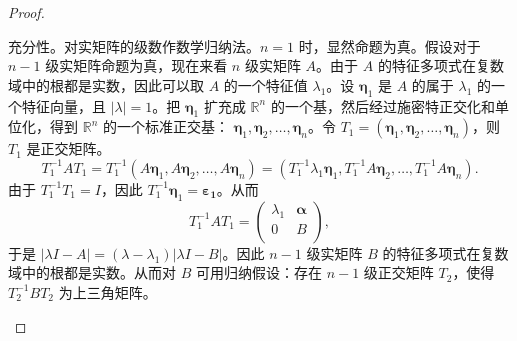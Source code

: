 \begin{enumerate}[1~]
\begin{proof}
\begin{subproof}
充分性。对实矩阵的级数作数学归纳法。$n = 1$ 时，显然命题为真。假设对于 $n - 1$ 级实矩阵命题为真，现在来看 $n$ 级实矩阵 $A$。由于 $A$ 的特征多项式在复数域中的根都是实数，因此可以取 $A$ 的一个特征值 $\lambda_1$。设 $\boldsymbol{\eta}_1$ 是 $A$ 的属于 $\lambda_1$ 的一个特征向量，且 $|\lambda| = 1$。把 $\boldsymbol{\eta}_1$ 扩充成 $\mathbb{R}^n$ 的一个基，然后经过施密特正交化和单位化，得到 $\mathbb{R}^n$ 的一个标准正交基：
$\boldsymbol{\eta}_{1}, \boldsymbol{\eta}_{2}, \dots, \boldsymbol{\eta}_{n}$。令 $T_1 = (\boldsymbol{\eta}_{1}, \boldsymbol{\eta}_{2}, \dots, \boldsymbol{\eta}_{n})$，则 $T_1$ 是正交矩阵。
\[
T_1^{-1} A T_1 = T_1^{-1}(A\boldsymbol{\eta}_{1}, A\boldsymbol{\eta}_{2}, \dots, A\boldsymbol{\eta}_{n}) = (T_1^{-1} \lambda_1 \boldsymbol{\eta}_{1}, T_1^{-1} A\boldsymbol{\eta}_{2}, \dots, T_1^{-1}A\boldsymbol{\eta}_{n}).
\]
由于 $T_1^{-1}T_1 = I$，因此 $T_1^{-1} \boldsymbol{\eta}_1 = \boldsymbol{\varepsilon_1}$。从而
\[
T_1^{-1}AT_1=\left( \begin{matrix}
	\lambda _1&		\boldsymbol{\boldsymbol{\alpha} }\\
	0&		B\\
\end{matrix} \right) ,
\]
于是 $|\lambda I-A| = (\lambda - \lambda_1) |\lambda I - B|$。因此 $n - 1$ 级实矩阵 $B$ 的特征多项式在复数域中的根都是实数。从而对 $B$ 可用归纳假设：存在 $n - 1$ 级正交矩阵 $T_2$，使得 $T_2^{-1} B T_2$ 为上三角矩阵。


\end{subproof}
\end{proof}
\end{enumerate}

